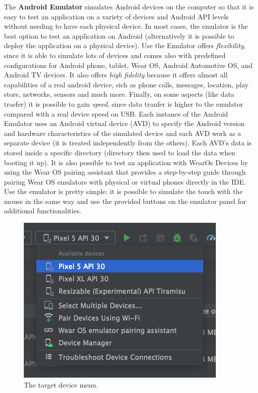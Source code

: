 \noindent \newline The \textbf{Android Emulator} simulates Android devices on the computer so that it is easy to test an application on a variety of devices and Android API levels without needing to have each physical device. In most cases, the emulator is the best option to test an application on Android (alternatively it is possible to deploy the application on a physical device). Use the Emulator offers \textit{flexibility}, since it is able to simulate lots of devices and comes also with predefined configurations for Android phone, tablet, Wear OS, Android Automotive OS, and Android TV devices. It also offers \textit{high fidelity} because it offers almost all capabilities of a real android device, sich as phone calls, messages, location, play store, networks, sensors and much more. Finally, on some aspects (like data trasfer) it is possible to gain \textit{speed}, since data tranfer is higher to the emulator compared with a real device speed on USB. Each instance of the Android Emulator uses an Android virtual device (AVD) to specify the Android version and hardware characteristics of the simulated device and each AVD work as a separate device (it is treated independently from the others). Each AVD's data is stored inside a specific directory (directory then used to load the data when booting it up). It is also possible to test an application with WearOs Devices by using the Wear OS pairing assistant that provides a step-by-step guide through pairing Wear OS emulators with physical or virtual phones directly in the IDE. Use the emulator is pretty simple: it is possible to simulate the touch with the mouse in the same way and use the provided buttons on the emulator panel for additional functionalities\cite{AndroidStudioEmulatorFeature}.

\begin{figure}
    \centering
    \includegraphics[width=0.6\linewidth]{./images/target_devices_dropdown.png}
    \caption[The target device menu.]{The target device menu\protect\cite{AndroidStudioEmulatorFeature}.}
\end{figure}


